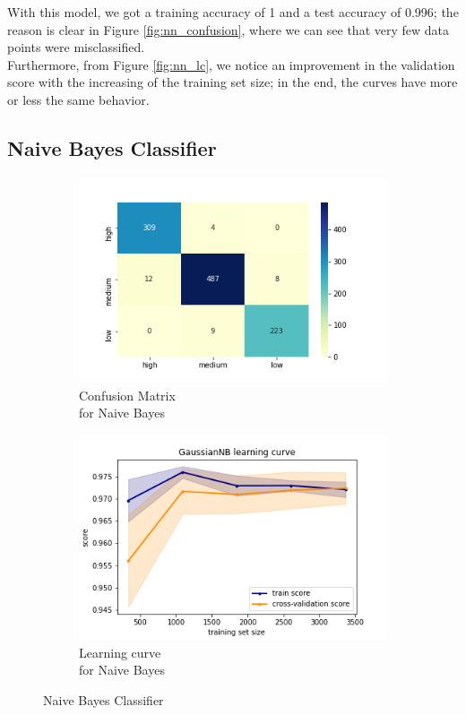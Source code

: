 With this model, we got a training accuracy of 1 and a test accuracy of 0.996; the reason is clear in Figure \ref{fig:nn_confusion}, where we can see that very few data points were misclassified.\\
Furthermore, from Figure \ref{fig:nn_lc}, we notice an improvement in the validation score with the increasing of the training set size; in the end, the curves have more or less the same behavior.

\subsection{Naive Bayes Classifier}
\begin{figure}[h!]
     \captionsetup{justification=centering}             
     \centering
     \begin{subfigure}{0.49\textwidth}
         \centering
         \captionsetup{type=figure}
         \includegraphics[scale=0.45]{img/classification/nb_confusion.png}
         \caption{Confusion Matrix \\ for Naive Bayes}
         \label{fig:nb_confusion}
     \end{subfigure}
     \begin{subfigure}{0.49\textwidth}
         \centering
         \includegraphics[scale=0.45]{img/classification/nb_lc.png}
         \caption{Learning curve \\ for Naive Bayes}
         \label{fig:nb_lc}
     \end{subfigure}
     \caption{Naive Bayes Classifier}
    \label{fig:nb}
\end{figure}
